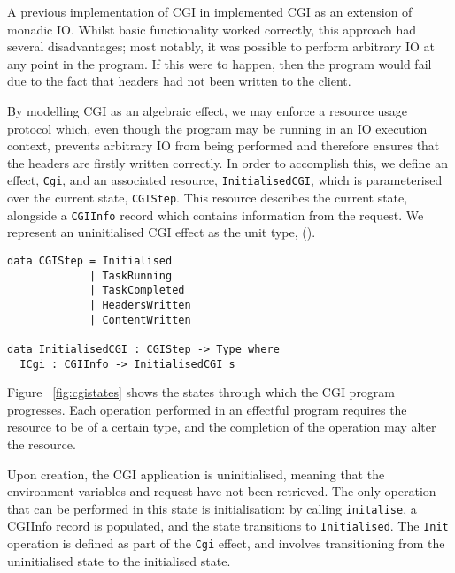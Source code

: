 \documentclass[preprint]{sigplanconf}
\begin{document}
A previous implementation of CGI in \idris{} implemented CGI as an extension of monadic IO. Whilst basic functionality worked correctly, this approach had several disadvantages; most notably, it was possible to perform arbitrary IO at any point in the program. If this were to happen, then the program would fail due to the fact that headers had not been written to the client.

By modelling CGI as an algebraic effect, we may enforce a resource usage protocol which, even though the program may be running in an IO execution context, prevents arbitrary IO from being performed and therefore ensures that the headers are firstly written correctly. In order to accomplish this, we define an effect, \texttt{Cgi}, and an associated resource, \texttt{InitialisedCGI}, which is parameterised over the current state, \texttt{CGIStep}. This resource describes the current state, alongside a \texttt{CGIInfo} record which contains information from the request. We represent an uninitialised CGI effect as the unit type, ().
{\small
\begin{verbatim}
data CGIStep = Initialised 
             | TaskRunning 
             | TaskCompleted 
             | HeadersWritten 
             | ContentWritten

data InitialisedCGI : CGIStep -> Type where
  ICgi : CGIInfo -> InitialisedCGI s
\end{verbatim}
}
Figure ~\ref{fig:cgistates} shows the states through which the CGI program progresses. Each operation performed in an effectful program requires the resource to be of a certain type, and the completion of the operation may alter the resource.

Upon creation, the CGI application is uninitialised, meaning that the environment variables and request have not been retrieved. The only operation that can be performed in this state is initialisation: by calling \texttt{initalise}, a CGIInfo record is populated, and the state transitions to \texttt{Initialised}. The \texttt{Init} operation is defined as part of the \texttt{Cgi} effect, and involves transitioning from the uninitialised state to the initialised state.
\end{document}
